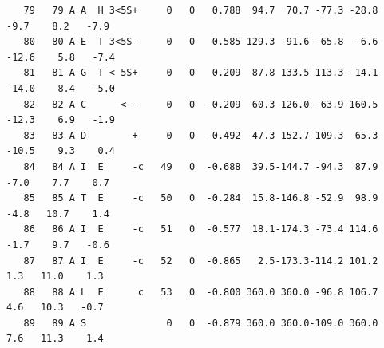 \documentclass[12pt]{article}
\begin{document}
\begin{lstlisting}
   79   79 A A  H 3<5S+     0   0   0.788  94.7  70.7 -77.3 -28.8   -9.7    8.2   -7.9
   80   80 A E  T 3<5S-     0   0   0.585 129.3 -91.6 -65.8  -6.6  -12.6    5.8   -7.4
   81   81 A G  T < 5S+     0   0   0.209  87.8 133.5 113.3 -14.1  -14.0    8.4   -5.0
   82   82 A C      < -     0   0  -0.209  60.3-126.0 -63.9 160.5  -12.3    6.9   -1.9
   83   83 A D        +     0   0  -0.492  47.3 152.7-109.3  65.3  -10.5    9.3    0.4
   84   84 A I  E     -c   49   0  -0.688  39.5-144.7 -94.3  87.9   -7.0    7.7    0.7
   85   85 A T  E     -c   50   0  -0.284  15.8-146.8 -52.9  98.9   -4.8   10.7    1.4
   86   86 A I  E     -c   51   0  -0.577  18.1-174.3 -73.4 114.6   -1.7    9.7   -0.6
   87   87 A I  E     -c   52   0  -0.865   2.5-173.3-114.2 101.2    1.3   11.0    1.3
   88   88 A L  E      c   53   0  -0.800 360.0 360.0 -96.8 106.7    4.6   10.3   -0.7
   89   89 A S              0   0  -0.879 360.0 360.0-109.0 360.0    7.6   11.3    1.4

\end{lstlisting}
	
\end{document}
